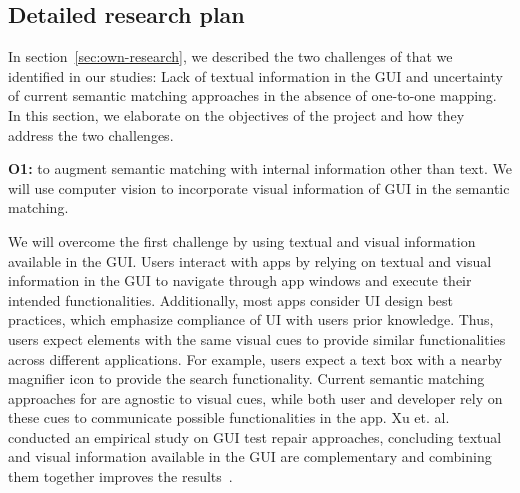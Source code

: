 \subsection{Detailed research plan}
\label{sec:detailed-plan}

In section~\ref{sec:own-research}, we described the two challenges of \testreuse that we identified in our studies:
Lack of textual information in the GUI and uncertainty of current semantic matching approaches in the absence of one-to-one mapping. 
In this section, we elaborate on the objectives of the \project project and how they address the two challenges.

\bigskip
\noindent
\textbf{O1:} to augment semantic matching with internal information other than text.  
We will use computer vision to incorporate visual information of GUI in the semantic matching.  

\bigskip
We will overcome the first challenge by using  textual and visual information available in the GUI.
Users interact with apps by relying on  textual and visual information in the GUI to navigate through app windows and execute their intended functionalities. 
Additionally, most apps consider UI design best practices, which emphasize compliance of UI with users prior knowledge.  
 Thus, users expect elements with the same visual cues to provide similar functionalities across different applications.
For example, users expect a text box with a nearby magnifier icon to provide  the search functionality.
Current semantic matching approaches for \testreuse are agnostic to visual cues, while both user and developer rely on these cues to communicate possible functionalities in the app. 
Xu et. al. conducted an empirical study on GUI test repair approaches, concluding textual and visual information available in the GUI are complementary and combining them together improves the results~\cite{Xu:GUIDER:ISSTA:2021}.




